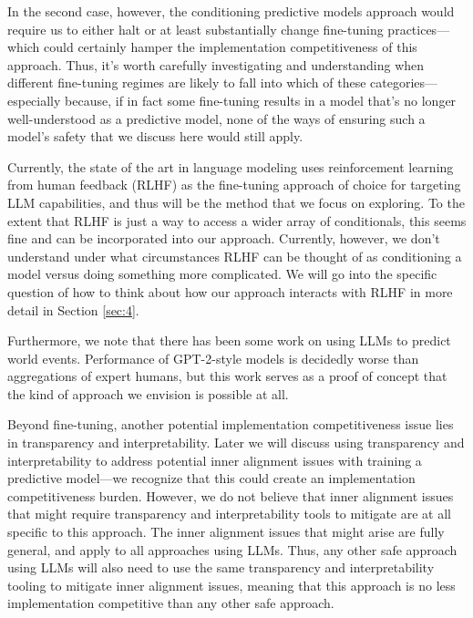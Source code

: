 \documentclass[
  onecolumn,
  natbib,
]{miri-tech-article}
\begin{document}
In the second case, however, the conditioning predictive models approach would require us to either halt or at least substantially change fine-tuning practices---which could certainly hamper the implementation competitiveness of this approach. Thus, it's worth carefully investigating and understanding when different fine-tuning regimes are likely to fall into which of these categories---especially because, if in fact some fine-tuning results in a model that's no longer well-understood as a predictive model, none of the ways of ensuring such a model's safety that we discuss here would still apply.

Currently, the state of the art in language modeling uses reinforcement learning from human feedback (RLHF) as the fine-tuning approach of choice for targeting LLM capabilities, and thus will be the method that we focus on exploring. To the extent that RLHF is just a way to access a wider array of conditionals\cite{conditioning_prompts_fine_tuning}, this seems fine and can be incorporated into our approach. Currently, however, we don't understand under what circumstances RLHF can be thought of as conditioning a model versus doing something more complicated. We will go into the specific question of how to think about how our approach interacts with RLHF in more detail in Section \ref{sec:4}.

Furthermore, we note that there has been some work\cite{zou_forecasting_2022} on using LLMs to predict world events. Performance of GPT-2-style models is decidedly worse than aggregations of expert humans, but this work serves as a proof of concept that the kind of approach we envision is possible at all.

Beyond fine-tuning, another potential implementation competitiveness issue lies in transparency and interpretability. Later we will discuss using transparency and interpretability to address potential inner alignment issues with training a predictive model---we recognize that this could create an implementation competitiveness burden. However, we do not believe that inner alignment issues that might require transparency and interpretability tools to mitigate are at all specific to this approach. The inner alignment issues that might arise are fully general, and apply to all approaches using LLMs. Thus, any other safe approach using LLMs will also need to use the same transparency and interpretability tooling to mitigate inner alignment issues, meaning that this approach is no less implementation competitive than any other safe approach.
\end{document}
